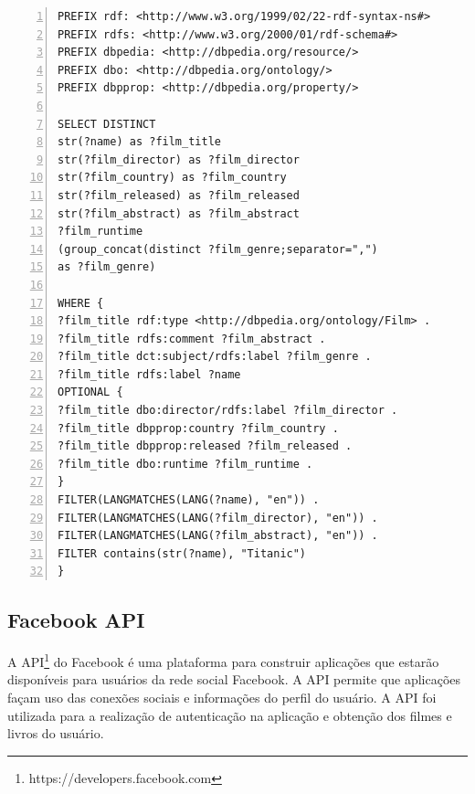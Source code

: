 \begin{lstlisting}[caption=Consulta SPARQL para um Filme., language=SPARQL, frame=single, label={cod:sparql-movie}, float, numbers=left]
PREFIX rdf: <http://www.w3.org/1999/02/22-rdf-syntax-ns#>
PREFIX rdfs: <http://www.w3.org/2000/01/rdf-schema#>
PREFIX dbpedia: <http://dbpedia.org/resource/>
PREFIX dbo: <http://dbpedia.org/ontology/>
PREFIX dbpprop: <http://dbpedia.org/property/>

SELECT DISTINCT
str(?name) as ?film_title
str(?film_director) as ?film_director
str(?film_country) as ?film_country
str(?film_released) as ?film_released
str(?film_abstract) as ?film_abstract
?film_runtime
(group_concat(distinct ?film_genre;separator=",") 
as ?film_genre)

WHERE {
?film_title rdf:type <http://dbpedia.org/ontology/Film> .
?film_title rdfs:comment ?film_abstract .
?film_title dct:subject/rdfs:label ?film_genre .
?film_title rdfs:label ?name
OPTIONAL {
?film_title dbo:director/rdfs:label ?film_director .
?film_title dbpprop:country ?film_country .
?film_title dbpprop:released ?film_released .
?film_title dbo:runtime ?film_runtime .
}
FILTER(LANGMATCHES(LANG(?name), "en")) .
FILTER(LANGMATCHES(LANG(?film_director), "en")) .
FILTER(LANGMATCHES(LANG(?film_abstract), "en")) .
FILTER contains(str(?name), "Titanic")
}
\end{lstlisting}

\subsection{Facebook API}
A API\footnote{https://developers.facebook.com} do Facebook é uma plataforma para construir aplicações que estarão disponíveis para usuários da rede social Facebook. A API permite que aplicações façam uso das conexões sociais e informações do perfil do usuário. A API foi utilizada para a realização de autenticação na aplicação e obtenção dos filmes e livros do usuário.







